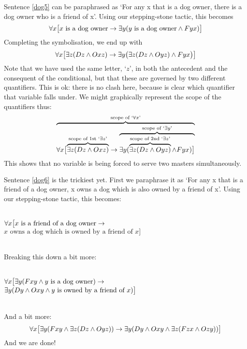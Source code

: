 Sentence \ref{dog5} can be paraphrased as `For any x that is a dog owner, there is a dog owner who is a friend of x'. Using our stepping-stone tactic, this becomes 
$$\forall x\bigl[\mbox{$x$ is a dog owner}\rightarrow\exists y(\mbox{$y$ is a dog owner}\wedge Fyx)\bigr]$$
Completing the symbolisation, we end up with
$$\forall x\bigl[\exists z(Dz \wedge Oxz)\rightarrow\exists y\bigl(\exists z(Dz \wedge Oyz)\wedge Fyx\bigr)\bigr]$$
Note that we have used the same letter, `$z$', in both the antecedent and the consequent of the conditional, but that these are governed by two different quantifiers. This is ok: there is no clash here, because is clear which quantifier that variable falls under. We might graphically represent the scope of the quantifiers thus:
$$\overbrace{\forall x\bigl[\overbrace{\exists z(Dz \wedge Oxz)}^{\text{scope of 1st `}\exists z\text{'}}\rightarrow \overbrace{\exists y(\overbrace{\exists z(Dz \wedge Oyz)}^{\text{scope of 2nd `}\exists z\text{'}}\wedge Fyx)\bigr]}^{\text{scope of `}\exists y\text{'}}}^{\text{scope of `}\forall x\text{'}}$$
This shows that no variable is being forced to serve two masters simultaneously.

Sentence \ref{dog6} is the trickiest yet. First we paraphrase it as `For any x that is a friend of a dog owner, x owns a dog which is also owned by a friend of x'. Using our stepping-stone tactic, this becomes:

\
\\$\forall x\bigl[x\text{ is a friend of a dog owner}\rightarrow \phantom{x}$\\
\phantom{x}\hfill $x\text{ owns a dog which is owned by a friend of }x\bigr]$

\
\\Breaking this down a bit more:

\
\\$\forall x\bigl[\exists y(Fxy \wedge y\text{ is a dog owner})\rightarrow \phantom{x}$\\
\phantom{x}\hfill $\exists y(Dy \wedge Oxy \wedge y\text{ is owned by a friend of }x)\bigr]$

\
\\And a bit more: 
$$\forall x\bigl[\exists y(Fxy \wedge \exists z(Dz \wedge Oyz)) \rightarrow \exists y(Dy \wedge Oxy \wedge \exists z(Fzx \wedge Ozy))\bigr]$$
And we are done!

